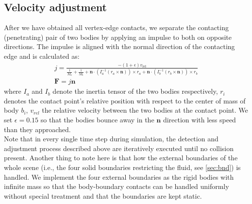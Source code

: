 \subsection{Velocity adjustment}
After we have obtained all vertex-edge contacts, we separate the contacting (penetrating) pair of two bodies by applying an impulse to both on opposite directions. The impulse is aligned with the normal direction of the contacting edge and is calculated as:
\begin{gather*}
j = \frac{-(1 + \epsilon) v_{\text{rel}}}
{\frac{1}{M_a} + \frac{1}{M_b} + \mathbf{n} \cdot \left( I_a^{-1} (r_a \times \mathbf{n}) \right) \times r_a + \mathbf{n}\cdot \left( I_b^{-1} (r_b \times \mathbf{n}) \right) \times r_b}\\
\mathbf{F}=j\mathbf{n}
\end{gather*}
where $I_a$ and $I_b$ denote the inertia tensor of the two bodies respectively, $r_i$ denotes the contact point's relative position with respect to the center of mass of body $b_i$, $v_{rel}$ the relative velocity between the two bodies at the contact point. We set $\epsilon = 0.15$ so that the bodies bounce away in the $\mathbf{n}$ direction with less speed than they approached. \\
Note that in every single time step during simulation, the detection and adjustment process described above are iteratively executed until no collision present. Another thing to note here is that how the external boundaries of the whole scene (i.e., the four solid boundaries restricting the fluid, see \autoref{sec:bnd}) is handled. We implement the four external boundaries as the rigid bodies with infinite mass so that the body-boundary contacts can be handled uniformly without special treatment and that the boundaries are kept static. 

